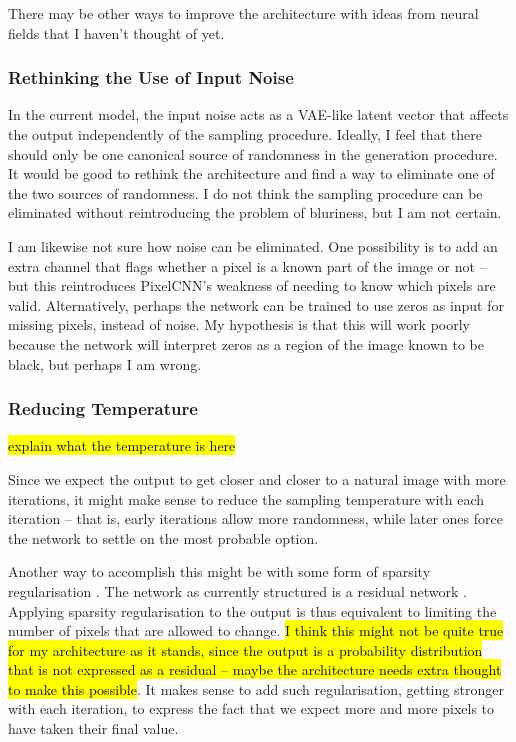 \documentclass[11pt, a4paper]{book}
\begin{document}
There may be other ways to improve the architecture with ideas from neural fields that I haven't thought of yet.

\subsubsection{Rethinking the Use of Input Noise}

In the current model, the input noise acts as a VAE-like latent vector that affects the output independently of the sampling procedure. Ideally, I feel that there should only be one canonical source of randomness in the generation procedure. It would be good to rethink the architecture and find a way to eliminate one of the two sources of randomness. I do not think the sampling procedure can be eliminated without reintroducing the problem of bluriness, but I am not certain.

I am likewise not sure how noise can be eliminated. One possibility is to add an extra channel that flags whether a pixel is a known part of the image or not -- but this reintroduces PixelCNN's weakness of needing to know which pixels are valid. Alternatively, perhaps the network can be trained to use zeros as input for missing pixels, instead of noise. My hypothesis is that this will work poorly because the network will interpret zeros as a region of the image known to be black, but perhaps I am wrong.

\subsubsection{Reducing Temperature} \label{temperature}

\hl{explain what the temperature is here}

Since we expect the output to get closer and closer to a natural image with more iterations, it might make sense to reduce the sampling temperature with each iteration -- that is, early iterations allow more randomness, while later ones force the network to settle on the most probable option.

Another way to accomplish this might be with some form of sparsity regularisation \citep{sparse1,sparse2}. The network as currently structured is a residual network \citep{resnet}. Applying sparsity regularisation to the output is thus equivalent to limiting the number of pixels that are allowed to change. \hl{I think this might not be quite true for my architecture as it stands, since the output is a probability distribution that is not expressed as a residual -- maybe the architecture needs extra thought to make this possible}. It makes sense to add such regularisation, getting stronger with each iteration, to express the fact that we expect more and more pixels to have taken their final value.
\end{document}
